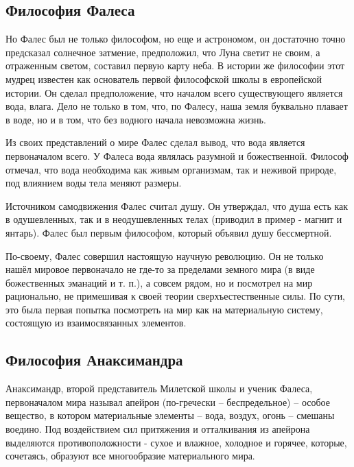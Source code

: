 \documentclass[a4paper, 14pt]{extreport}
\begin{document}
\subsection{Философия Фалеса}

Но Фалес был не только философом, но еще и астрономом, он достаточно
точно пред­сказал солнечное затмение, предположил, что Луна светит не
своим, а отраженным светом, составил первую карту неба. В ис­тории же
философии этот мудрец известен как основатель пер­вой философской школы
в европейской истории. Он сделал предположение, что началом всего
существующего является вода, влага. Дело не только в том, что, по
Фалесу, наша земля буквально плавает в воде, но и в том, что без водного
начала невозможна жизнь.

Из своих представлений о мире Фалес сделал вывод, что вода является
первоначалом всего. У Фалеса вода являлась разумной и божественной.
Философ отмечал, что вода необходима как живым организмам, так и неживой
природе, под влиянием воды тела меняют размеры.

Источником самодвижения Фалес считал душу. Он утверждал, что душа есть
как в одушевленных, так и в неодушевленных телах (приводил в пример -
магнит и янтарь). Фалес был первым философом, который объявил душу
бессмертной.

По-своему, Фалес совершил настоящую научную революцию. Он не только
нашёл мировое первоначало не где-то за пределами земного мира (в виде
божественных эманаций и т. п.), а совсем рядом, но и посмотрел на мир
рационально, не примешивая к своей теории сверхъестественные силы. По
сути, это была первая попытка посмотреть на мир как на материальную
систему, состоящую из взаимосвязанных элементов.

\subsection{Философия Анаксимандра}

Анаксимандр, второй представитель Милетской школы и ученик Фалеса,
первоначалом мира называл апейрон (по-гречески -- беспредельное) --
особое вещество, в котором материальные элементы -- вода, воздух, огонь
-- смешаны воедино. Под воздействием сил притяжения и отталкивания из
апейрона выделяются противоположности - сухое и влажное, холодное и
горячее, которые, сочетаясь, образуют все многообразие материального
мира.
\end{document}
